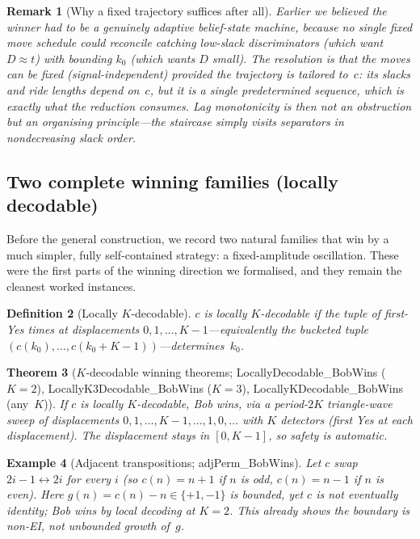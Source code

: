 \documentclass{article}
\newtheorem{theorem}{Theorem}[section]
\newtheorem{definition}[theorem]{Definition}
\newtheorem{remark}[theorem]{Remark}
\newtheorem{example}[theorem]{Example}
\newcommand{\Yes}{\textsf{Yes}}
\newcommand{\us}{\discretionary{}{}{}\_\discretionary{}{}{}}
\newcommand{\lean}[1]{{\small\ttfamily #1}}
\begin{document}
\begin{remark}[Why a fixed trajectory suffices after all]
Earlier we believed the winner had to be a genuinely adaptive
belief-state machine, because no single fixed move schedule could
reconcile catching low-slack discriminators (which want $D\approx t$) with
bounding $k_0$ (which wants $D$ small). The resolution is that the
\emph{moves} can be fixed (signal-independent) provided the trajectory is
tailored to~$c$: its slacks and ride lengths depend on~$c$, but it is a
single predetermined sequence, which is exactly what the reduction
consumes. Lag monotonicity is then not an obstruction but an organising
principle---the staircase simply visits separators in nondecreasing slack
order.
\end{remark}

\subsection{Two complete winning families (locally decodable)}
\label{sec:local}

Before the general construction, we record two natural families that win
by a much simpler, fully self-contained strategy: a fixed-amplitude
oscillation. These were the first parts of the winning direction we
formalised, and they remain the cleanest worked instances.

\begin{definition}[Locally $K$-decodable]\label{def:k}
$c$ is \emph{locally $K$-decodable} if the tuple of first-\Yes{} times at
displacements $0,1,\dots,K{-}1$---equivalently the bucketed tuple
$(c(k_0),\dots,c(k_0{+}K{-}1))$---determines~$k_0$.
\end{definition}

\begin{theorem}[$K$-decodable winning theorems; \lean{LocallyDecodable\us BobWins}
  ($K{=}2$), \lean{LocallyK3Decodable\us BobWins} ($K{=}3$),
  \lean{LocallyKDecodable\us BobWins} (any~$K$)]\label{thm:k}
If $c$ is locally $K$-decodable, Bob wins, via a period-$2K$ triangle-wave
sweep of displacements $0,1,\dots,K{-}1,\dots,1,0,\dots$ with $K$
detectors (first \Yes{} at each displacement). The displacement stays in
$[0,K{-}1]$, so safety is automatic.
\end{theorem}

\begin{example}[Adjacent transpositions; \lean{adjPerm\us BobWins}]\label{ex:adj}
Let $c$ swap $2i{-}1\leftrightarrow 2i$ for every $i$ (so $c(n)=n+1$ if
$n$ is odd, $c(n)=n-1$ if $n$ is even). Here $g(n)=c(n)-n\in\{+1,-1\}$ is
bounded, yet $c$ is not eventually identity; Bob wins by local decoding at
$K{=}2$. This already shows the boundary is non-EI, not unbounded growth
of~$g$.
\end{example}
\end{document}
